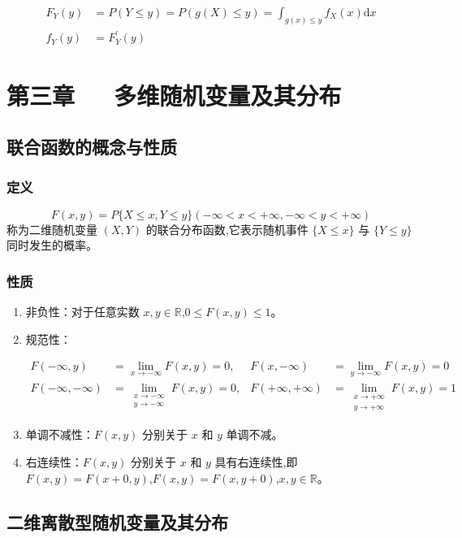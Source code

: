 \documentclass[UTF8]{ctexart}
\theoremstyle{remark}
\begin{document}
		\begin{align*}
			F_Y(y) &= P(Y \leq y) = P(g(X) \leq y) = \int_{g(x) \leq y} f_X(x) \mathrm{d}x\\
			f_Y(y) &= F_Y^\prime(y)
		\end{align*}
		
		\section{第三章~~~多维随机变量及其分布}
		\subsection{联合函数的概念与性质}
		\subsubsection{定义}
		\[
		F(x, y) = P\{X \leq x, Y \leq y\} (-\infty < x < +\infty, -\infty < y < +\infty)
		\]
		称为二维随机变量 \((X, Y)\) 的联合分布函数,它表示随机事件 \(\{X \leq x\}\) 与 \(\{Y \leq y\}\) 同时发生的概率。
		
		\subsubsection{性质}
		\begin{enumerate}
			\item 非负性：对于任意实数 \(x, y \in \mathbb{R}\),\(0 \leq F(x, y) \leq 1\)。
			\item 规范性：
			
			\begin{align*}
				F(-\infty, y) &= \lim_{x \to -\infty} F(x, y) = 0, & F(x, -\infty) &= \lim_{y \to -\infty} F(x, y) = 0\\
				F(-\infty, -\infty) &= \lim_{\substack{x \to -\infty\\y \to -\infty}} F(x, y) = 0, & F(+\infty, +\infty) &= \lim_{\substack{x \to +\infty\\y \to +\infty}} F(x, y) = 1
			\end{align*}
			
			\item 单调不减性：\(F(x, y)\) 分别关于 \(x\) 和 \(y\) 单调不减。
			\item 右连续性：\(F(x, y)\) 分别关于 \(x\) 和 \(y\) 具有右连续性,即 \(F(x, y) = F(x + 0, y)\),\(F(x, y) = F(x, y + 0)\),\(x, y \in \mathbb{R}\)。
		\end{enumerate}
		
		\subsection{二维离散型随机变量及其分布}
\end{document}
